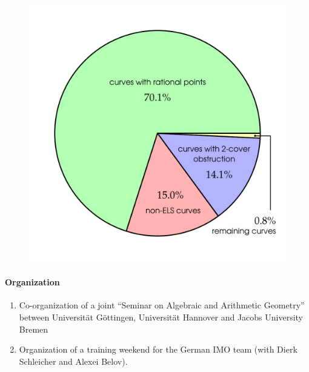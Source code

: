 %
\begin{figure}[ht]
  \begin{center}
    \includegraphics[width=\hsize]{Stoll/profStoll-fig1.pdf}
    \label{fig:profStoll}
   \end{center}
\end{figure}

\nocite{Stoll1}
\nocite{Stoll3}
\nocite{Stoll5}
\nocite{Stamminger}
\nocite{Stoll6}

\paragraph{Organization}

\begin{enumerate}
  \item Co-organization of a joint ``Seminar on Algebraic and Arithmetic
        Geometry'' between Universit\"at G\"ottingen, Universit\"at Hannover
        and Jacobs University Bremen
  \item Organization of a training weekend for the German IMO team
        (with Dierk Schleicher and Alexei Belov).
\end{enumerate}

